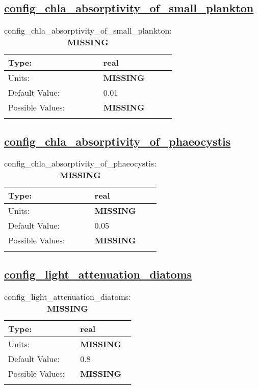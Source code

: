 \subsection[config\_chla\_absorptivity\_of\_small\_plankton]{\hyperref[sec:nm_tab_biogeochemistry]{config\_chla\_absorptivity\_of\_small\_plankton}}
\label{subsec:nm_sec_config_chla_absorptivity_of_small_plankton}
\begin{center}
\begin{longtable}{| p{2.0in} || p{4.0in} |}
    \hline
    Type: & real \\
    \hline
    Units: & {\bf \color{red} MISSING} \\
    \hline
    Default Value: & 0.01 \\
    \hline
    Possible Values: & {\bf \color{red} MISSING} \\
    \hline
    \caption{config\_chla\_absorptivity\_of\_small\_plankton: {\bf \color{red} MISSING}}
\end{longtable}
\end{center}
\subsection[config\_chla\_absorptivity\_of\_phaeocystis]{\hyperref[sec:nm_tab_biogeochemistry]{config\_chla\_absorptivity\_of\_phaeocystis}}
\label{subsec:nm_sec_config_chla_absorptivity_of_phaeocystis}
\begin{center}
\begin{longtable}{| p{2.0in} || p{4.0in} |}
    \hline
    Type: & real \\
    \hline
    Units: & {\bf \color{red} MISSING} \\
    \hline
    Default Value: & 0.05 \\
    \hline
    Possible Values: & {\bf \color{red} MISSING} \\
    \hline
    \caption{config\_chla\_absorptivity\_of\_phaeocystis: {\bf \color{red} MISSING}}
\end{longtable}
\end{center}
\subsection[config\_light\_attenuation\_diatoms]{\hyperref[sec:nm_tab_biogeochemistry]{config\_light\_attenuation\_diatoms}}
\label{subsec:nm_sec_config_light_attenuation_diatoms}
\begin{center}
\begin{longtable}{| p{2.0in} || p{4.0in} |}
    \hline
    Type: & real \\
    \hline
    Units: & {\bf \color{red} MISSING} \\
    \hline
    Default Value: & 0.8 \\
    \hline
    Possible Values: & {\bf \color{red} MISSING} \\
    \hline
    \caption{config\_light\_attenuation\_diatoms: {\bf \color{red} MISSING}}
\end{longtable}
\end{center}

